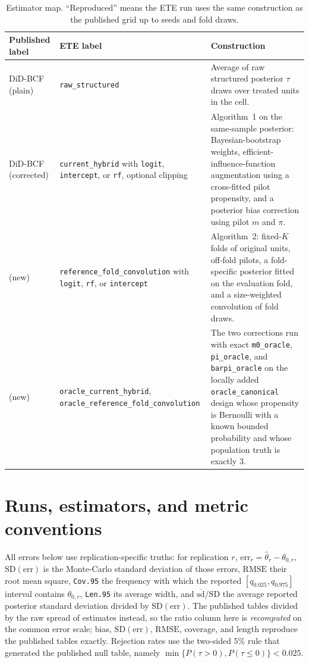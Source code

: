 \documentclass[11pt]{article}
\begin{document}
\begin{table}[htbp]
\centering
\footnotesize
\caption{Estimator map. ``Reproduced'' means the ETE run uses the same construction as
the published grid up to seeds and fold draws.}
\label{tab:map}
\begin{tabular}{p{}p{}p{}}
\toprule
Published label & ETE label & Construction \\
\midrule
DiD-BCF (plain) & \texttt{raw\_structured} & Average of raw structured posterior
$\tau$ draws over treated units in the cell. \\
DiD-BCF (corrected) & \texttt{current\_hybrid} with \texttt{logit}, \texttt{intercept},
or \texttt{rf}, optional clipping & Algorithm~1 on the same-sample posterior: Bayesian-bootstrap weights,
efficient-influence-function augmentation using a cross-fitted pilot propensity, and a
posterior bias correction using pilot $m$ and $\pi$. \\
(new) & \texttt{reference\_fold\_convolution} with \texttt{logit}, \texttt{rf}, or
\texttt{intercept} & Algorithm~2:
fixed-$K$ folds of original units, off-fold pilots, a fold-specific posterior fitted on
the evaluation fold, and a size-weighted convolution of fold draws. \\
(new) & \texttt{oracle\_current\_hybrid},
\texttt{oracle\_reference\_fold\_convolution} & The two corrections run with exact
\texttt{m0\_oracle}, \texttt{pi\_oracle}, and \texttt{barpi\_oracle} on the locally added
\texttt{oracle\_canonical} design whose propensity is Bernoulli with a known bounded
probability and whose population truth is exactly $3$. \\
\bottomrule
\end{tabular}
\end{table}

\section{Runs, estimators, and metric conventions}
\label{sec:conventions}

All errors below use replication-specific truths: for replication $r$,
$\mathrm{err}_r=\widehat\theta_r-\theta_{0,r}$, $\mathrm{SD(err)}$ is the Monte-Carlo
standard deviation of those errors, $\mathrm{RMSE}$ their root mean square,
\texttt{Cov.95} the frequency with which the reported $[q_{0.025},q_{0.975}]$ interval
contains $\theta_{0,r}$, \texttt{Len.95} its average width, and
$\overline{\mathrm{sd}}/\mathrm{SD}$ the average reported posterior standard deviation
divided by $\mathrm{SD(err)}$. The published tables divided by the raw spread of
estimates instead, so the ratio column here is \emph{recomputed} on the common error
scale; bias, $\mathrm{SD(err)}$, $\mathrm{RMSE}$, coverage, and length reproduce the
published tables exactly. Rejection rates use the two-sided $5\%$ rule that generated
the published null table, namely $\min\{P(\tau>0),P(\tau\le0)\}<0.025$.
\end{document}
